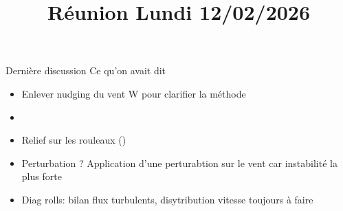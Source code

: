 

\graphicspath{{FIGURES/}}

\title{Réunion Lundi 12/02/2026}
\author{}

\usepackage[caption = false]{subfig}

\begin{frame}
\maketitle
\end{frame}

\begin{frame}{Dernière discussion}
Ce qu'on avait dit
  \begin{itemize}
    \item Enlever nudging du vent W pour clarifier la méthode
    \item 
    \item Relief sur les rouleaux (\cite{swathiUniqueRollClouds2025})
    \item Perturbation ? Application d'une perturabtion sur le vent car instabilité la plus forte
    \item Diag rolls: bilan flux turbulents, disytribution vitesse toujours à faire 
  \end{itemize}
\end{frame}


